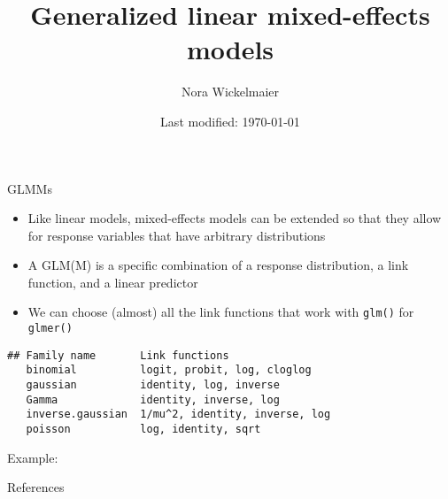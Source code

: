 \documentclass[aspectratio=169]{beamer}
\title{Generalized linear mixed-effects models}
\author{Nora Wickelmaier}
\date{Last modified: \today}
\begin{document}
\begin{frame}{}
\thispagestyle{empty}
\titlepage
\end{frame}


\begin{frame}[fragile]{GLMMs}
  \begin{itemize}
    \item Like linear models, mixed-effects models can be extended so that they
      allow for response variables that have arbitrary distributions
    \item A GLM(M) is a specific combination of a response distribution, a link
      function, and a linear predictor 
    \item We can choose (almost) all the link functions that work with
      \texttt{glm()} for \texttt{glmer()}
  \end{itemize}
\begin{lstlisting}
## Family name       Link functions
   binomial          logit, probit, log, cloglog
   gaussian          identity, log, inverse
   Gamma             identity, inverse, log
   inverse.gaussian  1/mu^2, identity, inverse, log
   poisson           log, identity, sqrt
\end{lstlisting}
\end{frame}

\begin{frame}{Example: }
\end{frame}

\appendix
\begin{frame}{References}
  \printbibliography
\end{frame}
\end{document}
